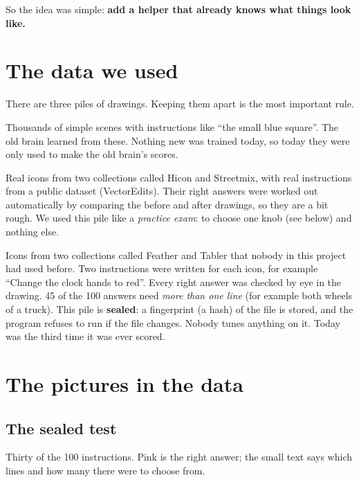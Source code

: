 \documentclass[11pt,a4paper]{article}
\begin{document}
So the idea was simple: \textbf{add a helper that already knows what things look like.}

\section*{The data we used}

There are three piles of drawings. Keeping them apart is the most important rule.

\begin{description}[leftmargin=1.6em, style=nextline]
  \item[1. Practice drawings (made up by a program).] Thousands of simple scenes with instructions like ``the small blue square''. The old brain learned from these. Nothing new was trained today, so today they were only used to make the old brain's scores.
  \item[2. The old test (80 drawings).] Real icons from two collections called Hicon and Streetmix, with real instructions from a public dataset (VectorEdits). Their right answers were worked out automatically by comparing the before and after drawings, so they are a bit rough. We used this pile like a \emph{practice exam}: to choose one knob (see below) and nothing else.
  \item[3. The real test (100 instructions on 50 icons).] Icons from two collections called Feather and Tabler that nobody in this project had used before. Two instructions were written for each icon, for example ``Change the clock hands to red''. Every right answer was checked by eye in the drawing. 45 of the 100 answers need \emph{more than one line} (for example both wheels of a truck). This pile is \textbf{sealed}: a fingerprint (a hash) of the file is stored, and the program refuses to run if the file changes. Nobody tunes anything on it. Today was the third time it was ever scored.
\end{description}

\section*{The pictures in the data}

\subsection*{The sealed test}
Thirty of the 100 instructions. Pink is the right answer; the small text says which lines and how many there were to choose from.
\end{document}
